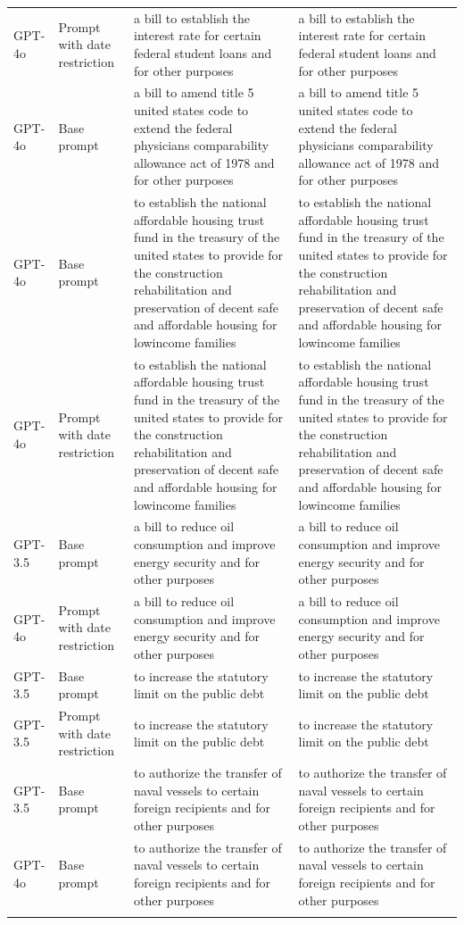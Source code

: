 \begin{longtable}{>{\raggedright\arraybackslash}p{1.4cm}>{\raggedright\arraybackslash}p{1.4cm}>{\raggedright\arraybackslash}p{5.5cm}>{\raggedright\arraybackslash}p{5.5cm}}
GPT-4o & Prompt with date restriction & a bill to establish the interest rate for certain federal student loans and for other purposes & a bill to establish the interest rate for certain federal student loans and for other purposes\\
GPT-4o & Base prompt & a bill to amend title 5 united states code to extend the federal physicians comparability allowance act of 1978 and for other purposes & a bill to amend title 5 united states code to extend the federal physicians comparability allowance act of 1978 and for other purposes\\
GPT-4o & Base prompt & to establish the national affordable housing trust fund in the treasury of the united states to provide for the construction rehabilitation and preservation of decent safe and affordable housing for lowincome families & to establish the national affordable housing trust fund in the treasury of the united states to provide for the construction rehabilitation and preservation of decent safe and affordable housing for lowincome families\\
GPT-4o & Prompt with date restriction & to establish the national affordable housing trust fund in the treasury of the united states to provide for the construction rehabilitation and preservation of decent safe and affordable housing for lowincome families & to establish the national affordable housing trust fund in the treasury of the united states to provide for the construction rehabilitation and preservation of decent safe and affordable housing for lowincome families\\
GPT-3.5 & Base prompt & a bill to reduce oil consumption and improve energy security and for other purposes & a bill to reduce oil consumption and improve energy security and for other purposes\\
GPT-4o & Prompt with date restriction & a bill to reduce oil consumption and improve energy security and for other purposes & a bill to reduce oil consumption and improve energy security and for other purposes\\
GPT-3.5 & Base prompt & to increase the statutory limit on the public debt & to increase the statutory limit on the public debt\\
GPT-3.5 & Prompt with date restriction & to increase the statutory limit on the public debt & to increase the statutory limit on the public debt\\
GPT-3.5 & Base prompt & to authorize the transfer of naval vessels to certain foreign recipients and for other purposes & to authorize the transfer of naval vessels to certain foreign recipients and for other purposes\\
GPT-4o & Base prompt & to authorize the transfer of naval vessels to certain foreign recipients and for other purposes & to authorize the transfer of naval vessels to certain foreign recipients and for other purposes\\*
\end{longtable}
